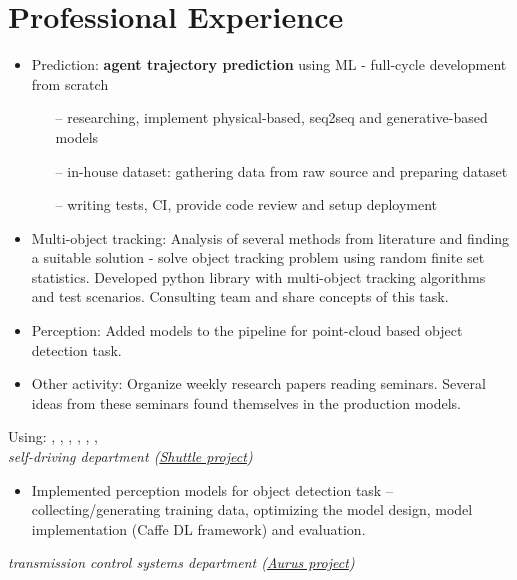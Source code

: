\section*{\sectionformat Professional Experience}
% 
\begin{itemize}
    \item Prediction: \textbf{agent trajectory prediction} using ML - full-cycle development from scratch
          \begin{itemize}
              \item[--] researching, implement physical-based, seq2seq and generative-based models
              \item[--] in-house dataset: gathering data from raw source and preparing dataset
              \item[--] writing tests, CI, provide code review and setup deployment
          \end{itemize}
    \item Multi-object tracking: Analysis of several methods from literature and finding a suitable solution - solve object tracking problem using random finite set statistics. Developed python library with multi-object tracking algorithms and test scenarios. Consulting team and share concepts of this task.
    \item Perception: Added models to the pipeline for point-cloud based object detection task.
    \item Other activity: Organize weekly research papers reading seminars. Several ideas from these seminars found themselves in the production models.
\end{itemize}
Using: , , , , , , 
\horizontalline
% 
 \\
\textit{self-driving department (\href{https://www.engadget.com/2016/08/28/yandex-teams-on-self-driving-shuttle-bus/}{Shuttle project})}
\begin{itemize}
    \item Implemented perception models for object detection task -- collecting/generating training data, optimizing the model design, model implementation (Caffe DL framework) and evaluation.
\end{itemize}
\textit{transmission control systems department (\href{https://en.wikipedia.org/wiki/Aurus_Senat}{Aurus project})}
